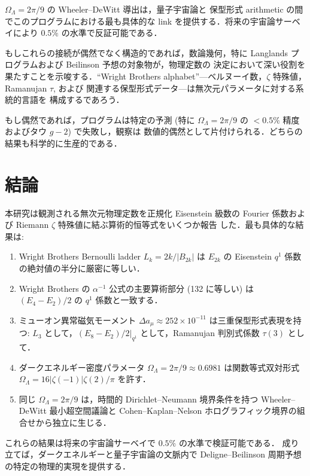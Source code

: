\documentclass[11pt,a4paper]{article}
\begin{document}
$\Omega_\Lambda = 2\pi/9$ の Wheeler--DeWitt 導出は，量子宇宙論と
保型形式 arithmetic の間でこのプログラムにおける最も具体的な link
を提供する．将来の宇宙論サーベイにより $0.5\%$ の水準で反証可能である．

もしこれらの接続が偶然でなく構造的であれば，数論幾何，特に
Langlands プログラムおよび Beilinson 予想の対象物が，物理定数の
決定において深い役割を果たすことを示唆する．``Wright Brothers
alphabet''---ベルヌーイ数，$\zeta$ 特殊値，Ramanujan $\tau$, および
関連する保型形式データ---は無次元パラメータに対する系統的言語を
構成するであろう．

もし偶然であれば，プログラムは特定の予測 (特に $\Omega_\Lambda
= 2\pi/9$ の $< 0.5\%$ 精度およびタウ $g-2$) で失敗し，観察は
数値的偶然として片付けられる．どちらの結果も科学的に生産的である．

\section{結論}

本研究は観測される無次元物理定数を正規化 Eisenstein 級数の Fourier
係数および Riemann $\zeta$ 特殊値に結ぶ算術的恒等式をいくつか報告
した．最も具体的な結果は:
\begin{enumerate}
\item[(i)] Wright Brothers Bernoulli ladder $L_k = 2k/|B_{2k}|$ は
$E_{2k}$ の Eisenstein $q^1$ 係数の絶対値の半分に厳密に等しい．
\item[(ii)] Wright Brothers の $\alpha^{-1}$ 公式の主要算術部分
(132 に等しい) は $(E_4 - E_2)/2$ の $q^1$ 係数と一致する．
\item[(iii)] ミューオン異常磁気モーメント
$\Delta a_\mu \approx 252 \times 10^{-11}$ は三重保型形式表現を持つ:
$L_3$ として，$(E_8 - E_2)/2|_{q^1}$ として，Ramanujan 判別式係数
$\tau(3)$ として．
\item[(iv)] ダークエネルギー密度パラメータ
$\Omega_\Lambda = 2\pi/9 \approx 0.6981$ は関数等式双対形式
$\Omega_\Lambda = 16|\zeta(-1)|\zeta(2)/\pi$ を許す．
\item[(v)] 同じ $\Omega_\Lambda = 2\pi/9$ は，時間的 Dirichlet--Neumann
境界条件を持つ Wheeler--DeWitt 最小超空間議論と Cohen--Kaplan--Nelson
ホログラフィック境界の組合せから独立に生じる．
\end{enumerate}

これらの結果は将来の宇宙論サーベイで $0.5\%$ の水準で検証可能である．
成り立てば，ダークエネルギーと量子宇宙論の文脈内で Deligne--Beilinson
周期予想の特定の物理的実現を提供する．
\end{document}
